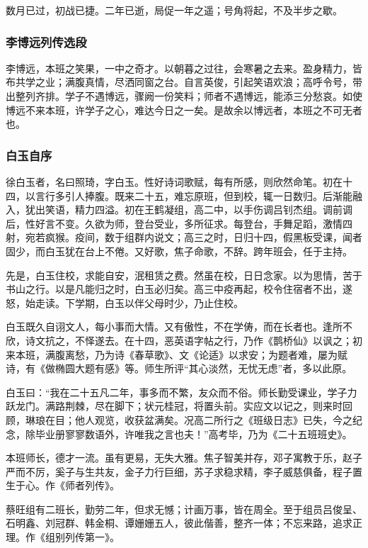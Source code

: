 \documentclass[a5paper]{ctexart}
\begin{document}
	数月已过，初战已捷。二年已逝，局促一年之遥；号角将起，不及半步之歇。
	
	
	\subsubsection{李博远列传选段}
	李博远，本班之笑果，一中之奇才。以朝暮之过往，会寒暑之去来。盈身精力，皆布共学之业；满腹真情，尽洒同窗之台。自言英俊，引起笑语欢浪；高呼令号，带出整列齐排。学子不遇博远，骤阙一份笑料；师者不遇博远，能添三分愁哀。如使博远不来本班，许学子之心，难达今日之一矣。是故余以博远者，本班之不可无者也。
	
	\subsubsection{白玉自序}
	徐白玉者，名曰照琦，字白玉。性好诗词歌赋，每有所感，则欣然命笔。初在十四，以言行多引人捧腹。既来二十五，难忘原班，但到校，辄一日数归。后渐能融入，犹出笑语，精力四溢。初在王鹤凝组，高二中，以手伤调吕钊杰组。调前调后，性好言不变。久欲为师，登台受业，多所征求。每登台，手舞足蹈，激情四射，宛若疯猴。疫间，数于组群内说文；高三之时，日归十四，假黑板受课，闻者固少，而白玉犹在台上不倦。又好歌，焦子命歌，不辞。跨年班会，任于主持。
	
	先是，白玉住校，求能自安，泯租赁之费。然虽在校，日日念家。以为思情，苦于书山之行。以是凡能归之时，白玉必归矣。高三中疫再起，校令住宿者不出，遂怒，始走读。下学期，白玉以伴父母时少，乃止住校。
	
	白玉既久自诩文人，每小事而大情。又有傲性，不在学俦，而在长者也。逢所不欣，诗文抗之，不怿遂去。在十四，恶英语字帖之行，乃作《鹊桥仙》以讽之；初来本班，满腹离愁，乃为诗《春草歌》、文《论适》以求安；为题者难，屡为赋诗，有《做椭圆大题有感》等。师生所评“其心淡然，无忧无虑”者，多以此原。
	
	白玉曰：“我在二十五凡二年，事多而不繁，友众而不俗。师长勤受课业，学子力跃龙门。满路荆棘，尽在脚下；状元桂冠，将置头前。实应文以记之，则来时回顾，琳琅在目；他人观览，收获盆满矣。况高二所行之《班级日志》已失，今之纪念，除毕业册寥寥数语外，许唯我之言也夫！”高考毕，乃为《二十五班班史》。
	
	本班师长，德才一流。虽有更易，无失大雅。焦子智美并存，邓子寓教于乐，赵子严而不厉，奚子与生共友，金子力行巨细，苏子求稳求精，李子威慈俱备，程子置生于心。作《师者列传》。
	
	蔡旺组有二班长，勤劳二年，但求无憾；计画万事，皆在周全。至于组员吕俊呈、石明鑫、刘冠群、韩金桐、谭姗姗五人，彼此偕善，整齐一体；不忘来路，追求正理。作《组别列传第一》。
	
\end{document}
